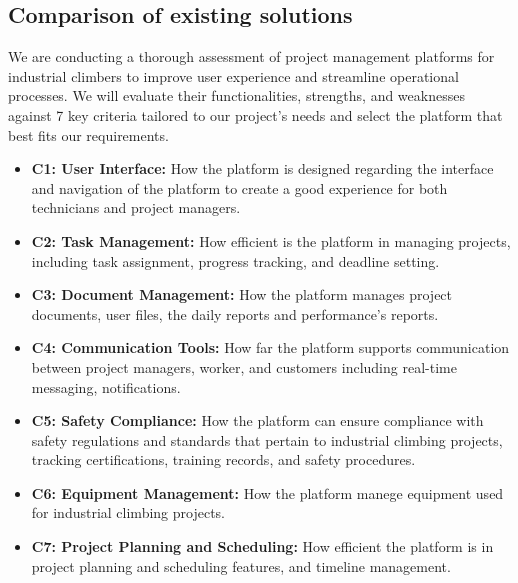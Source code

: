 \subsection{Comparison of existing solutions}
We are conducting a thorough assessment of project management platforms for industrial climbers to improve user experience and streamline operational processes. We will evaluate their functionalities, strengths, and weaknesses against 7 key criteria tailored to our project's needs and select the platform that best fits our requirements.

\begin{itemize}
    \item \textbf{C1: User Interface:} How the platform is designed regarding the interface and navigation of the platform to create a good experience for both technicians and project managers.

    \item \textbf{C2: Task Management:} How efficient is the platform in managing projects, including task assignment, progress tracking, and deadline setting.

    \item \textbf{C3: Document Management:} How the platform manages project documents, user files, the daily reports and performance’s reports.
    \item \textbf{C4: Communication Tools:} How far the platform supports communication between project managers, worker, and customers including real-time messaging, notifications.

    \item \textbf{C5: Safety Compliance:} How the platform can ensure compliance with safety regulations and standards that pertain to industrial climbing projects, tracking certifications, training records, and safety procedures.
    \item \textbf{C6: Equipment Management:} How the platform manege equipment used for industrial climbing projects.
    \item \textbf{C7: Project Planning and Scheduling:} How efficient the platform is in project planning and scheduling features, and timeline management.
\end{itemize}

